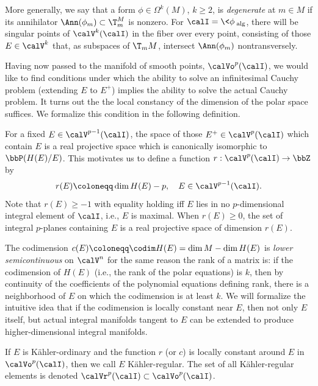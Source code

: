 \begin{rem}
    More generally, we say that a form $\phi\in\Omega^k(M)$, $k\geq 2$, is \emph{degenerate} at $m\in M$ if its annihilator $\Ann(\phi_m)\subset \T_m^ M$ is nonzero. For $\calI=\<\phi\>_{\mathrm{alg}}$, there will be singular points of $\calV^k(\calI)$ in the fiber over every point, consisting of those $E\in\calV^k$ that, as subspaces of $\T_m M$, intersect $\Ann(\phi_m)$ nontransversely.
\end{rem}


Having now passed to the manifold of smooth points, $\calVo^p(\calI)$, we would like to find conditions under which the ability to solve an infinitesimal Cauchy problem (extending $E$ to $E^+$) implies the ability to solve the actual Cauchy problem. It turns out the the local constancy of the dimension of the polar space suffices. We formalize this condition in the following definition.

For a fixed $E\in\calV^{p-1}(\calI)$, the space of those $E^+\in\calV^{p}(\calI)$ which contain $E$ is a real projective space which is canonically isomorphic to $\bbP(H(E)\slash E)$. This motivates us to define a function $r:\calV^p(\calI)\to \bbZ$ by 
\[r(E)\coloneqq \dim H(E)-p,\quad E\in\calV^{p-1}(\calI).\]
Note that $r(E)\geq -1$ with equality holding iff $E$ lies in no $p$-dimensional integral element of $\calI$, i.e., $E$ is maximal. When $r(E)\geq 0$, the set of integral $p$-planes containing $E$ is a real projective space of dimension $r(E)$.

The codimension $c(E)\coloneqq \codim H(E)=\dim M-\dim H(E)$ is \emph{lower semicontinuous} on $\calV^n$ for the same reason the rank of a matrix is: if the codimension of $H(E)$ (i.e., the rank of the polar equations) is $k$, then by continuity of the coefficients of the polynomial equations defining rank, there is a neighborhood of $E$ on which the codimension is at least $k$. We will formalize the intuitive idea that if the codimension is locally constant near $E$, then not only $E$ itself, but actual integral manifolds tangent to $E$ can be extended to produce higher-dimensional integral manifolds.

\begin{defn}
    If $E$ is K\"ahler-ordinary and the function $r$ (or $c$) is locally constant around $E$ in $\calVo^p(\calI)$, then we call $E$ K\"ahler-regular. The set of all K\"ahler-regular elements is denoted $\calVr^p(\calI)\subset\calVo^p(\calI)$.
\end{defn}

